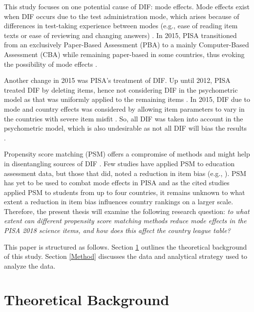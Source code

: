 \documentclass{article}
\begin{document}
This study focuses on one potential cause of DIF: mode effects. Mode effects exist when DIF occurs due to the test administration mode, which arises because of differences in test-taking experience between modes (e.g., ease of reading item texts or ease of reviewing and changing answers) \citep{kolen2014practical}. In 2015, PISA transitioned from an exclusively Paper-Based Assessment (PBA) to a mainly Computer-Based Assessment (CBA) while remaining paper-based in some countries, thus evoking the possibility of mode effects \citep{OECD2015}.

Another change in 2015 was PISA's treatment of DIF. Up until 2012, PISA treated DIF by deleting items, hence not considering DIF in the psychometric model as that was uniformly applied to the remaining items \citep{zwitser2017monitoring, OECD2012}. In 2015, DIF due to mode and country effects was considered by allowing item parameters to vary in the countries with severe item misfit \citep{feskens2019differential, OECD2015}. So, all DIF was taken into account in the psychometric model, which is also undesirable as not all DIF will bias the results \citep{zumbo2005matter, zwitser2017monitoring}. 

Propensity score matching (PSM) offers a compromise of methods and might help in disentangling sources of DIF \citep{liu2020investigating}. Few studies have applied PSM to education assessment data, but those that did, noted a reduction in item bias (e.g., \citet{arikan2018propensity, joldersma2010application, lee2014effect, wu2006using, seo2015comparability, puhan2005evaluating}). PSM has yet to be used to combat mode effects in PISA and as the cited studies applied PSM to students from up to four countries, it remains unknown to what extent a reduction in item bias influences country rankings on a larger scale. Therefore, the present thesis will examine the following research question: \textit{to what extent can different propensity score matching methods reduce mode effects in the PISA 2018 science items, and how does this affect the country league table?} 

This paper is structured as follows. Section \ref{Theory} outlines the theoretical background of this study. Section \ref{Method} discusses the data and analytical strategy used to analyze the data. 

\section{Theoretical Background} \label{Theory}
\end{document}
